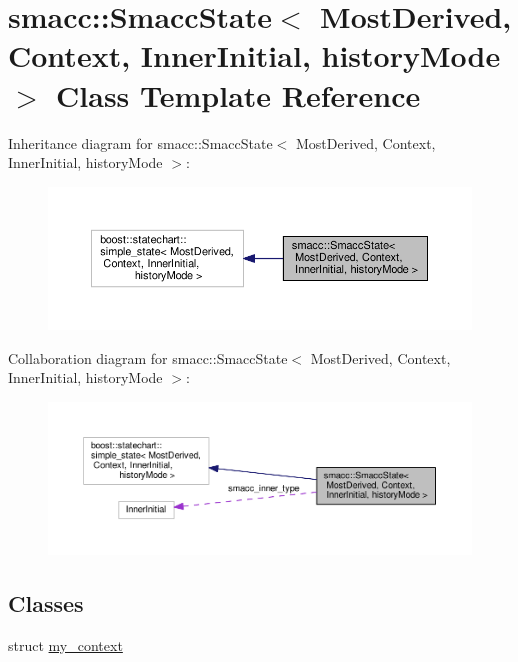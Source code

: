 \hypertarget{classsmacc_1_1SmaccState}{\section{smacc\-:\-:Smacc\-State$<$ Most\-Derived, Context, Inner\-Initial, history\-Mode $>$ Class Template Reference}
\label{classsmacc_1_1SmaccState}
}


Inheritance diagram for smacc\-:\-:Smacc\-State$<$ Most\-Derived, Context, Inner\-Initial, history\-Mode $>$\-:
\nopagebreak
\begin{figure}[H]
\begin{center}
\leavevmode
\includegraphics[width=350pt]{classsmacc_1_1SmaccState__inherit__graph}
\end{center}
\end{figure}


Collaboration diagram for smacc\-:\-:Smacc\-State$<$ Most\-Derived, Context, Inner\-Initial, history\-Mode $>$\-:
\nopagebreak
\begin{figure}[H]
\begin{center}
\leavevmode
\includegraphics[width=350pt]{classsmacc_1_1SmaccState__coll__graph}
\end{center}
\end{figure}
\subsection*{Classes}
\begin{DoxyCompactItemize}
\item 
struct \hyperlink{structsmacc_1_1SmaccState_1_1my__context}{my\-\_\-context}
\end{DoxyCompactItemize}
